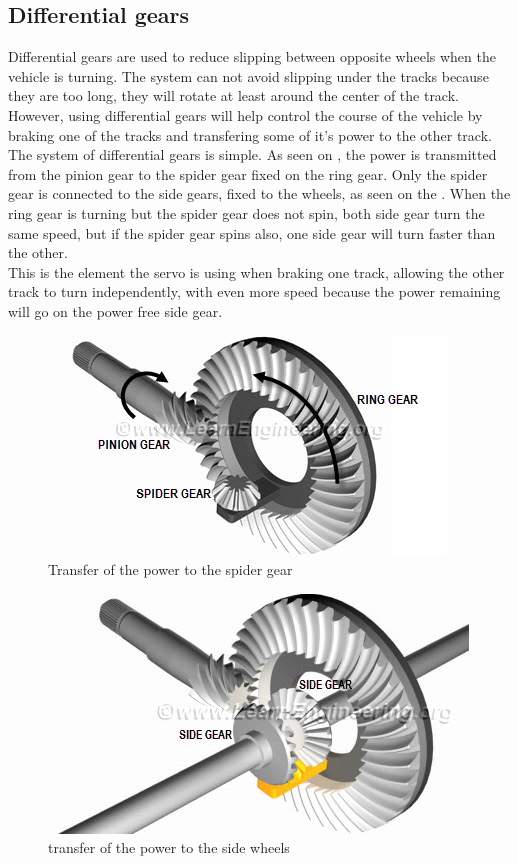\subsection{Differential gears}

Differential gears are used to reduce slipping between opposite wheels when the vehicle is turning. The system can not avoid slipping under the tracks because they are too long, they will rotate at least around the center of the track. However, using differential gears will help control the course of the vehicle by braking one of the tracks and transfering some of it's power to the other track.\\

The system of differential gears is simple. As seen on , the power is transmitted from the pinion gear to the spider gear fixed on the ring gear. Only the spider gear is connected to the side gears, fixed to the wheels, as seen on the . When the ring gear is turning but the spider gear does not spin, both side gear turn the same speed, but if the spider gear spins also, one side gear will turn faster than the other.\\

This is the element the servo is using when braking one track, allowing the other track to turn independently, with even more speed because the power remaining will go on the power free side gear.\\


\begin{figure}[H]
	\centering
	\includegraphics[scale=1]{figures/pinion-ring-spider_gear.jpg}
	\caption{Transfer of the power to the spider gear}
	\label{pinion-ring-spider_gear}
\end{figure}

\begin{figure}[H]
	\centering
	\includegraphics[scale=1]{figures/full_differential_gears.jpg}
	\caption{transfer of the power to the side wheels}
	\label{full_differential_gears}
\end{figure}
